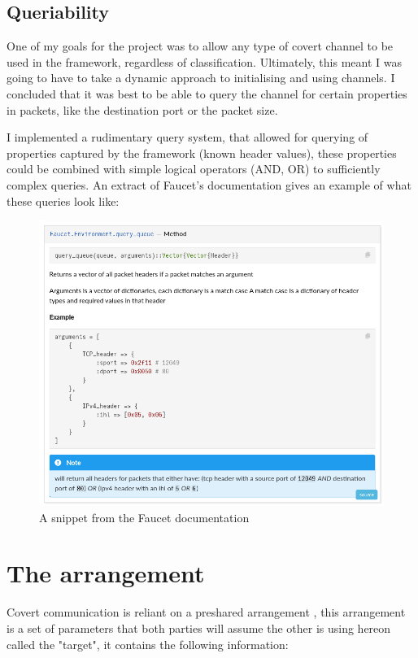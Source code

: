 \subsection{Queriability}

One of my goals for the project was to allow any type of covert channel to be used in the framework, regardless of classification. Ultimately, this meant I was going to have to take a dynamic approach to initialising and using channels. I concluded that it was best to be able to query the channel for certain properties in packets, like the destination port or the packet size.

I implemented a rudimentary query system, that allowed for querying of properties captured by the framework (known header values), these properties could be combined with simple logical operators (AND, OR) to sufficiently complex queries. An extract of Faucet's documentation gives an example of what these queries look like:

\begin{figure}[!h]
    \centering
    \includegraphics[width=\textwidth]{fig/docs_query_queue.png}
    \caption{A snippet from the Faucet documentation}
    \label{fig:doc_snippet}
\end{figure}

\section{The arrangement}
\label{sec:target}

Covert communication is reliant on a preshared arrangement \citep{DoCCaS}, this arrangement is a set of parameters that both parties will assume the other is using hereon called the "target", it contains the following information:

